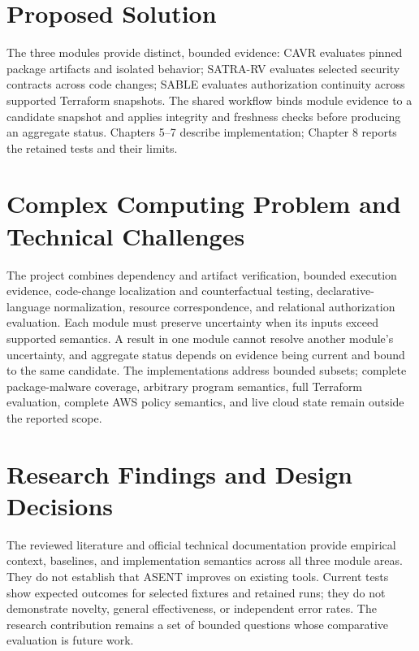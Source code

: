 \section{Proposed Solution}
The three modules provide distinct, bounded evidence: CAVR evaluates pinned package artifacts and isolated behavior; SATRA-RV evaluates selected security contracts across code changes; SABLE evaluates authorization continuity across supported Terraform snapshots. The shared workflow binds module evidence to a candidate snapshot and applies integrity and freshness checks before producing an aggregate status. Chapters 5--7 describe implementation; Chapter 8 reports the retained tests and their limits.

\section{Complex Computing Problem and Technical Challenges}
The project combines dependency and artifact verification, bounded execution evidence, code-change localization and counterfactual testing, declarative-language normalization, resource correspondence, and relational authorization evaluation. Each module must preserve uncertainty when its inputs exceed supported semantics. A result in one module cannot resolve another module's uncertainty, and aggregate status depends on evidence being current and bound to the same candidate. The implementations address bounded subsets; complete package-malware coverage, arbitrary program semantics, full Terraform evaluation, complete AWS policy semantics, and live cloud state remain outside the reported scope.

\section{Research Findings and Design Decisions}
The reviewed literature and official technical documentation provide empirical context, baselines, and implementation semantics across all three module areas. They do not establish that ASENT improves on existing tools. Current tests show expected outcomes for selected fixtures and retained runs; they do not demonstrate novelty, general effectiveness, or independent error rates. The research contribution remains a set of bounded questions whose comparative evaluation is future work.
